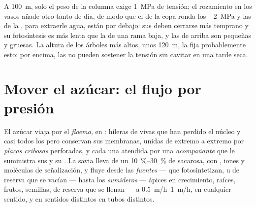 \begin{example}\label{ex:b1:plant-transport:top}
A \qty{100}{m}, solo el peso de la columna exige \qty{1}{MPa} de tensión; el
rozamiento en los vasos añade otro tanto de día, de modo que el  de la
copa ronda los \qty{-2}{MPa} y las  de la , para extraerle agua,
están por debajo: sus  deben cerrarse más temprano y su fotosíntesis
es más lenta que la de una rama baja, y las  de arriba son pequeñas y
gruesas. La altura de los árboles más altos, unos \qty{120}{m}, la fija
probablemente esto: por encima, las  no pueden sostener la tensión sin
cavitar en una tarde seca.
\end{example}

\section{Mover el azúcar: el flujo por presión}

\begin{definition}\label{def:b1:plant-transport:phloem}
El azúcar viaja por el \emph{floema}, en \emph{}: hileras de
 vivas que han perdido el núcleo y casi todos los  pero
conservan sus membranas, unidas de extremo a extremo por \emph{placas
cribosas} perforadas, y cada una atendida por una \emph{ acompañante}
que le suministra sus  y su . La savia lleva de un
\qtyrange{10}{30}{\%} de sacarosa, con , iones y moléculas de
señalización, y fluye desde las \emph{fuentes} ---  que fotosintetizan,
u  de reserva que se vacían --- hasta los \emph{sumideros} ---
ápices en crecimiento, raíces, frutos, semillas,  de reserva que se
llenan --- a \qtyrange{0.5}{1}{m/h}, en cualquier sentido, y en sentidos
distintos en tubos distintos.
\end{definition}

